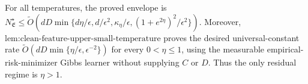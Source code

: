 For all temperatures, the proved envelope is \(N^\star_{\mathfrak E}\le\widetilde O(dD\min\{d\eta/\epsilon,d/\epsilon^2,\kappa_\eta/\epsilon,(1+e^{2\eta})^2/\epsilon^2\})\). Moreover, \(\text{lem:clean-feature-upper-small-temperature}\) proves the desired universal-constant rate \(\widetilde O(dD\min\{\eta/\epsilon,\epsilon^{-2}\})\) for every \(0<\eta\le1\), using the measurable empirical-risk-minimizer Gibbs learner without supplying \(C\) or \(D\). Thus the only residual regime is \(\eta>1\).